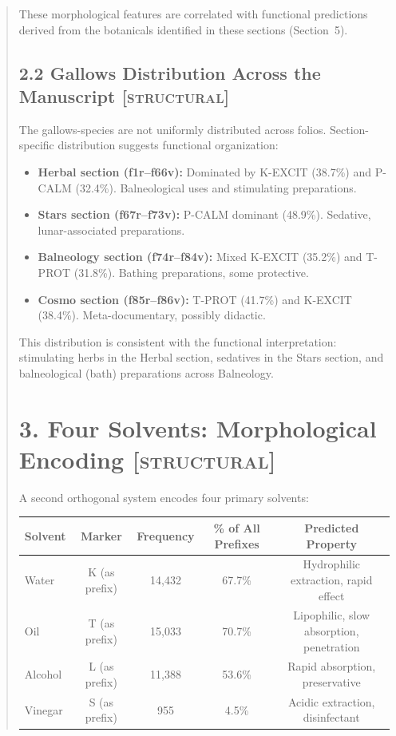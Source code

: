 \documentclass[11pt,a4paper]{article}
\begin{document}
\begin{abstract}
These morphological features are correlated with functional predictions derived from the botanicals identified in these sections (Section~5).

\subsection*{2.2 Gallows Distribution Across the Manuscript \textsc{[structural]}}

The gallows-species are not uniformly distributed across folios. Section-specific distribution suggests functional organization:

\begin{itemize}
\item \textbf{Herbal section (f1r--f66v):} Dominated by K-EXCIT (38.7\%) and P-CALM (32.4\%). Balneological uses and stimulating preparations.

\item \textbf{Stars section (f67r--f73v):} P-CALM dominant (48.9\%). Sedative, lunar-associated preparations.

\item \textbf{Balneology section (f74r--f84v):} Mixed K-EXCIT (35.2\%) and T-PROT (31.8\%). Bathing preparations, some protective.

\item \textbf{Cosmo section (f85r--f86v):} T-PROT (41.7\%) and K-EXCIT (38.4\%). Meta-documentary, possibly didactic.

\end{itemize}

This distribution is consistent with the functional interpretation: stimulating herbs in the Herbal section, sedatives in the Stars section, and balneological (bath) preparations across Balneology.

\section*{3. Four Solvents: Morphological Encoding \textsc{[structural]}}

A second orthogonal system encodes four primary solvents:

\begin{center}
\begin{tabular}{lcccc}
\hline
\textbf{Solvent} & \textbf{Marker} & \textbf{Frequency} & \textbf{\% of All Prefixes} & \textbf{Predicted Property} \\
\hline
Water & K (as prefix) & 14,432 & 67.7\% & Hydrophilic extraction, rapid effect \\
Oil & T (as prefix) & 15,033 & 70.7\% & Lipophilic, slow absorption, penetration \\
Alcohol & L (as prefix) & 11,388 & 53.6\% & Rapid absorption, preservative \\
Vinegar & S (as prefix) & 955 & 4.5\% & Acidic extraction, disinfectant \\
\hline
\end{tabular}
\end{center}


\end{abstract}
\end{document}
